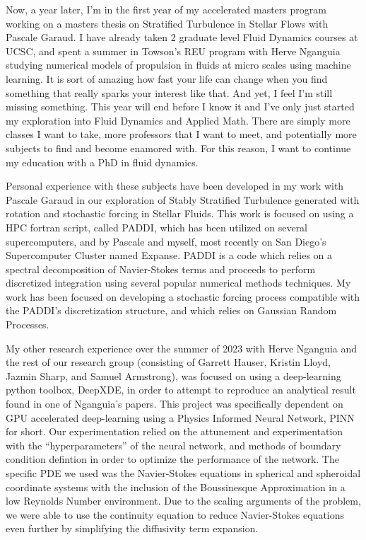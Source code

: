 \documentclass{article}
\begin{document}
Now, a year later, I'm in the first year of my accelerated masters program working on a masters thesis on Stratified Turbulence in Stellar Flows with Pascale Garaud. I have already taken 2 graduate level Fluid Dynamics courses at UCSC, and spent a summer in Towson's REU program with Herve Nganguia studying numerical models of propulsion in fluids at micro scales using machine learning. It is sort of amazing how fast your life can change when you find something that really sparks your interest like that. And yet, I feel I'm still missing something. This year will end before I know it and I've only just started my exploration into Fluid Dynamics and Applied Math. There are simply more classes I want to take, more professors that I want to meet, and potentially more subjects to find and become enamored with. For this reason, I want to continue my education with a PhD in fluid dynamics.
 
Personal experience with these subjects have been developed in my work with Pascale Garaud in our exploration of Stably Stratified Turbulence generated with rotation and stochastic forcing in Stellar Fluids. This work is focused on using a HPC fortran script, called PADDI, which has been utilized on several supercomputers, and by Pascale and myself, most recently on San Diego's Supercomputer Cluster named Expanse. PADDI is a code which relies on a spectral decomposition of Navier-Stokes terms and proceeds to perform discretized integration using several popular numerical methods techniques. My work has been focused on developing a stochastic forcing process compatible with the PADDI's discretization structure, and which relies on Gaussian Random Processes. 

My other research experience over the summer of 2023 with Herve Nganguia and the rest of our research group (consisting of Garrett Hauser, Kristin Lloyd, Jazmin Sharp, and Samuel Armstrong), was focused on using a deep-learning python toolbox, DeepXDE, in order to attempt to reproduce an analytical result found in one of Nganguia's papers. This project was specifically dependent on GPU accelerated deep-learning using a Physics Informed Neural Network, PINN for short. Our experimentation relied on the attunement and experimentation with the ``hyperparameters'' of the neural network, and methods of boundary condition defintion in order to optimize the performance of the network. The specific PDE we used was the Navier-Stokes equations in spherical and spheroidal coordinate systems with the inclusion of the Boussinesque Approximation in a low Reynolds Number environment. Due to the scaling arguments of the problem, we were able to use the continuity equation to reduce Navier-Stokes equations even further by simplifying the diffusivity term expansion.
\end{document}
